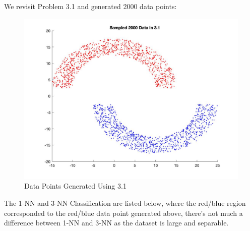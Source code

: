 \documentclass[12pt]{article}
\begin{document}
\newpage
{} \\\\
\indent We revisit Problem 3.1 and generated 2000 data points:
\begin{figure}[H]
  \centering
  \includegraphics[scale = 0.3]{5.jpg}
  \caption{Data Points Generated Using 3.1}
  \label{fig:5}
\end{figure}
\indent The 1-NN and 3-NN Classification are listed below, where the red/blue region corresponded to the red/blue data point generated above, there's not much a difference between 1-NN and 3-NN as the dataset is large and separable.
\end{document}
